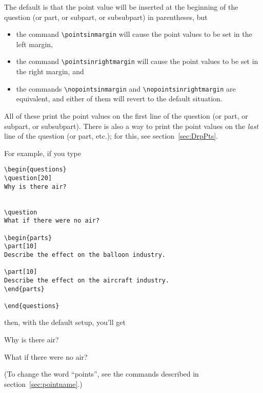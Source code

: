 \documentclass[12pt]{exam}
\begin{document}
The default is that the point value will be inserted at the beginning
of the question (or part, or subpart, or subsubpart) in parentheses,
but
\begin{itemize}
\item the command \verb"\pointsinmargin" will cause the point values
  to be set in the left margin,
\item the command \verb"\pointsinrightmargin" will cause the point
  values to be set in the right margin, and
\item the commands \verb"\nopointsinmargin" and
  \verb"\nopointsinrightmargin" are equivalent, and either of them
  will  revert to the default situation.
\end{itemize}
All of these print the point values on the first line of the question
(or part, or subpart, or subsubpart).  There is also a way to print
the point values on the \emph{last} line of the question (or part,
etc.); for this, see section~\ref{sec:DrpPts}.

\medbreak

For example, if you type
%
\begin{verbatim}
\begin{questions}
\question[20]
Why is there air?


\question
What if there were no air?

\begin{parts}
\part[10]
Describe the effect on the balloon industry.

\part[10]
Describe the effect on the aircraft industry.
\end{parts}

\end{questions}
\end{verbatim}
%
then, with the default setup, you'll get
\nopointsinmargin
\begin{questions}
\question[20]
Why is there air?


\question
What if there were no air?


\end{questions}
(To change the word ``points'', see the commands described in
section~\ref{sec:pointname}.)
\end{document}
